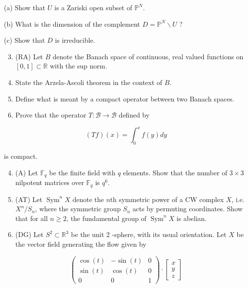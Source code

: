\documentclass[10pt]{article}
\begin{document}
(a) Show that $U$ is a Zariski open subset of $\mathbb{P}^{N}$.

(b) What is the dimension of the complement $D=\mathbb{P}^{N} \backslash U$ ?

(c) Show that $D$ is irreducible.

\begin{enumerate}
  \setcounter{enumi}{2}
  \item (RA) Let $B$ denote the Banach space of continuous, real valued functions on $[0,1] \subset \mathbb{R}$ with the sup norm.

  \item State the Arzela-Ascoli theorem in the context of $B$.

  \item Define what is meant by a compact operator between two Banach spaces.

  \item Prove that the operator $T: \mathcal{B} \rightarrow \mathcal{B}$ defined by

\end{enumerate}

$$
(T f)(x)=\int_{0}^{x} f(y) d y
$$

is compact.

\begin{enumerate}
  \setcounter{enumi}{3}
  \item (A) Let $\mathbb{F}_{q}$ be the finite field with $q$ elements. Show that the number of $3 \times 3$ nilpotent matrices over $\mathbb{F}_{q}$ is $q^{6}$.

  \item (AT) Let $\operatorname{Sym}^{n} X$ denote the $n$th symmetric power of a CW complex $X$, i.e. $X^{n} / S_{n}$, where the symmetric group $S_{n}$ acts by permuting coordinates. Show that for all $n \geq 2$, the fundamental group of $\operatorname{Sym}^{n} X$ is abelian.

  \item (DG) Let $S^{2} \subset \mathbb{R}^{3}$ be the unit 2 -sphere, with its usual orientation. Let $X$ be the vector field generating the flow given by

\end{enumerate}

$$
\left(\begin{array}{ccc}
\cos (t) & -\sin (t) & 0 \\
\sin (t) & \cos (t) & 0 \\
0 & 0 & 1
\end{array}\right) \cdot\left[\begin{array}{l}
x \\
y \\
z
\end{array}\right]
$$
\end{document}
